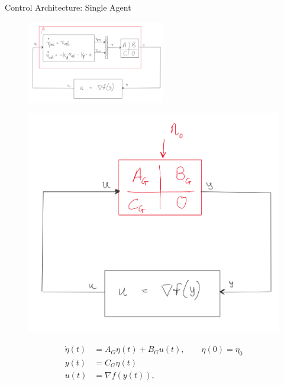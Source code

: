 \documentclass{beamer}
\begin{document}
\begin{frame}{Control Architecture: Single Agent}
	\begin{figure}[!htb]
		\centering
		\begin{minipage}{.6\textwidth}
			\centering
			\includegraphics[width=6cm]{figures/Figure_IQC_paper.PNG}
			\centering
			\label{fig:Figure_IQC_paper}
		\end{minipage}%
		\begin{minipage}{0.4\textwidth}
			\centering
			\includegraphics[width=1.1\linewidth,height=0.4\textheight]{figures/loop.png}
		\end{minipage}
	\end{figure}
	\begin{equation} \label{eq:sys_dyn_G}
		\begin{split}
			\Dot{\eta}(t)&=A_G\eta(t) + B_G u(t), \quad \quad \eta(0)=\eta_0\\
			y(t)&=C_G \eta(t) \\
			u(t)&=\nabla f(y(t)),
		\end{split}
	\end{equation}
\end{frame}
\end{document}
